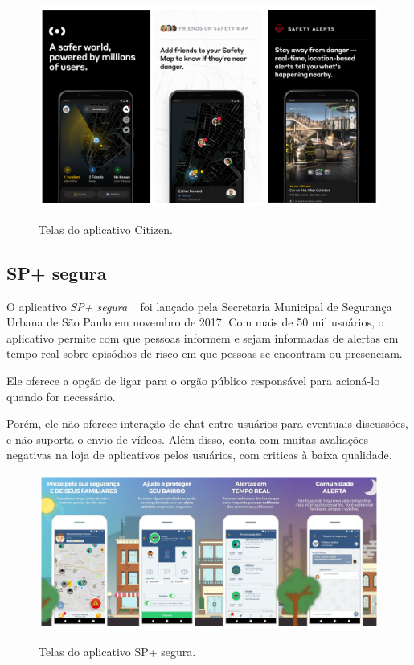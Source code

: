 \begin{figure}[h]
	\caption{\small Telas do aplicativo Citizen.}
	\centering
	\includegraphics[width=\textwidth]{./images/citizen.png}
	\label{f.citizen}
\end{figure}

\subsection{SP+ segura}

O aplicativo \emph{SP+ segura} ~\cite{sp-mais-segura} foi lançado pela Secretaria Municipal de Segurança Urbana de São Paulo em novembro de 2017. Com mais de 50 mil usuários, o aplicativo permite com que pessoas informem e sejam informadas de alertas em tempo real sobre episódios de risco em que pessoas se encontram ou presenciam. 

Ele oferece a opção de ligar para o orgão público responsável para acioná-lo quando for necessário.

Porém, ele não oferece interação de chat entre usuários para eventuais discussões, e não suporta o envio de vídeos. Além disso, conta com muitas avaliações negativas na loja de aplicativos pelos usuários, com criticas à baixa qualidade.

\begin{figure}[h]
	\caption{\small Telas do aplicativo SP+ segura.}
	\centering
	\includegraphics[width=\textwidth]{./images/sp-mais-segura.png}
	\label{f.sp-mais-segura}
\end{figure}


